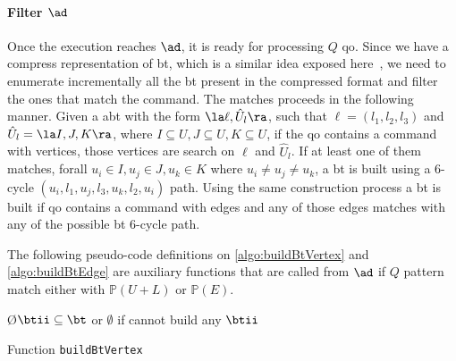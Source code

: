 \paragraph{Filter $\ad$} Once the execution reaches $\ad$, it is ready for processing $Q$ \acrlong{qo}. 
Since we have a compress representation of \acrshort{bt}, which is a similar idea exposed here~\cite{Lai}, we need to enumerate incrementally all the \acrshort{bt} present in the compressed format and filter the ones that match the command.
The matches proceeds in the following manner. Given a \acrshort{abt} with the form $\la \ell, \hat{U}_l \ra$, such that $\ell = (l_1,l_2,l_3)$ and $\hat{U}_l = \la I,J,K \ra$, where $I \subseteq U, J \subseteq U, K \subseteq U$, if the \acrshort{qo} contains a command with vertices, those vertices are search on $\ell$ and $\hat{U}_l$. 
If at least one of them matches, forall $u_i \in I, u_j \in J, u_k \in K$ where $ u_i \neq u_j \neq u_k$, a \acrshort{bt} is built using a 6-cycle $(u_i, l_1, u_j, l_3, u_k, l_2, u_i)$ path.
Using the same construction process a \acrshort{bt} is built if \acrshort{qo} contains a command with edges and any of those edges matches with any of the possible \acrshort{bt} 6-cycle path.

The following pseudo-code definitions on \autoref{algo:buildBtVertex} and \autoref{algo:buildBtEdge} are auxiliary functions that are called
from $\ad$ if $Q$ pattern match either with $\mathbb{P}(U + L)$ or $\mathbb{P}(E)$.

\begin{algorithm}
\SetAlgoRefName{[A9]}
\O{$\btii \subseteq \bt$ or $\emptyset$ if cannot build any $\btii$}
\caption{Function \texttt{buildBtVertex}}
\label{algo:buildBtVertex}
\end{algorithm}

